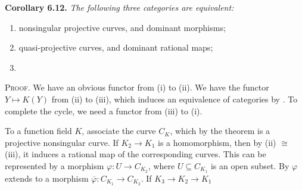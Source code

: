 {\smallskip
\noindent\hypertarget{result-I-6.12}{}\hypertarget{err-I-6-12}{}\textbf{Corollary 6.12.} \emph{The following three categories are equivalent:}
\begin{enumerate}[label=(\roman*),leftmargin=2.4em,nosep]
\itshape
\item nonsingular projective curves, and dominant morphisms;
\item quasi-projective curves, and dominant rational maps;
\item {}
\end{enumerate}

\smallskip
\noindent\textsc{Proof.} We have an obvious functor from (i) to (ii). We have the functor $Y\mapsto K(Y)$ from (ii) to (iii), which induces an equivalence of categories by . To complete the cycle, we need a functor from (iii) to (i).

To a function field $K$, associate the curve $C_K$, which by the theorem is a projective nonsingular curve. If $K_2\to K_1$ is a homomorphism, then by (ii) $\cong$ (iii), it induces a rational map of the corresponding curves. This can be represented by a morphism $\varphi\colon U\to C_{K_2}$, where $U\subseteq C_{K_1}$ is an open subset. By  $\varphi$ extends to a morphism $\overline\varphi\colon C_{K_1}\to C_{K_2}$. If $K_3\to K_2\to K_1$}
